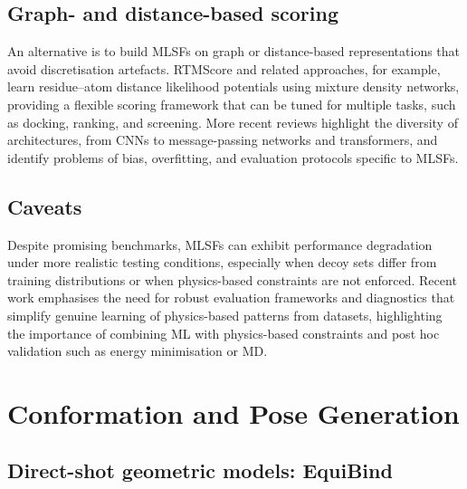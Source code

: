 \documentclass[12pt]{article}
\begin{document}
\subsection{Graph- and distance-based scoring}

An alternative is to build MLSFs on graph or distance-based representations that avoid discretisation artefacts. RTMScore\cite{CH13_qiu2024rtm} and related approaches, for example, learn residue–atom distance likelihood potentials using mixture density networks, providing a flexible scoring framework that can be tuned for multiple tasks, such as docking, ranking, and screening\cite{CH13_shen2023generalized}. More recent reviews highlight the diversity of architectures, from CNNs to message-passing networks and transformers, and identify problems of bias, overfitting, and evaluation protocols specific to MLSFs\cite{CH13_meli2022dlreview,CH13_durant2025robustly}.

\subsection{Caveats}

Despite promising benchmarks, MLSFs can exhibit performance degradation under more realistic testing conditions, especially when decoy sets differ from training distributions or when physics-based constraints are not enforced\cite{CH13_durant2025robustly}. Recent work emphasises the need for robust evaluation frameworks and diagnostics that simplify genuine learning of physics-based patterns from datasets, highlighting the importance of combining ML with physics-based constraints and post hoc validation such as energy minimisation or MD.\cite{CH13_posebusters2023}

\section{Conformation and Pose Generation}

\subsection{Direct-shot geometric models: EquiBind}
\end{document}

